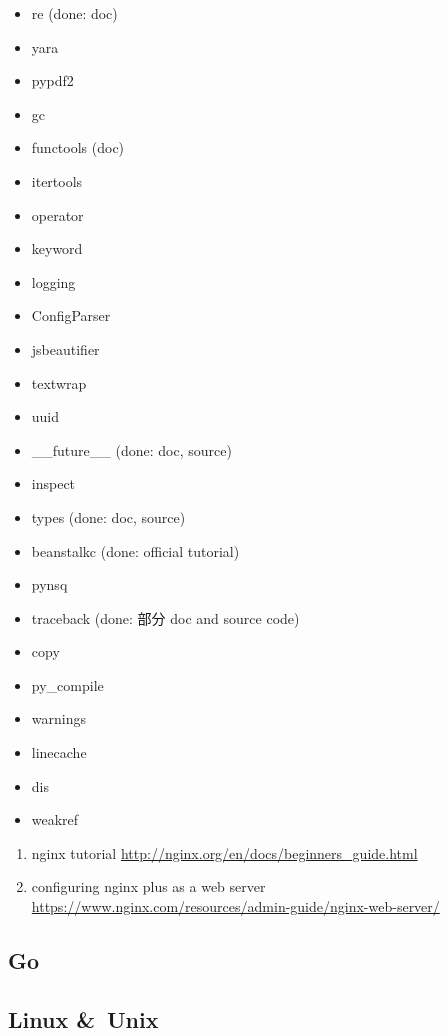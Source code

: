 \documentclass{article}
\begin{document}
\begin{enumerate}
\begin{itemize}
            \item re (done: doc)
            \item yara
            \item pypdf2
            \item gc
            \item functools (doc)
            \item itertools
            \item operator
            \item keyword
            \item logging
            \item ConfigParser
            \item jsbeautifier
            \item textwrap
            \item uuid
            \item __future__ (done: doc, source)
            \item inspect
            \item types (done: doc, source)
            \item beanstalkc (done: official tutorial)
            \item pynsq
            \item traceback (done: 部分 doc and source code)
            \item copy
            \item py_compile
            \item warnings
            \item linecache
            \item dis
            \item weakref
        \end{itemize}
        \begin{enumerate}
            \item nginx tutorial \url{http://nginx.org/en/docs/beginners_guide.html}
            \item configuring nginx plus as a web server \url{https://www.nginx.com/resources/admin-guide/nginx-web-server/}
        \end{enumerate}
\end{enumerate}
%
\subsection{Go}
%
\subsection{Linux \&\ Unix}
\end{document}
